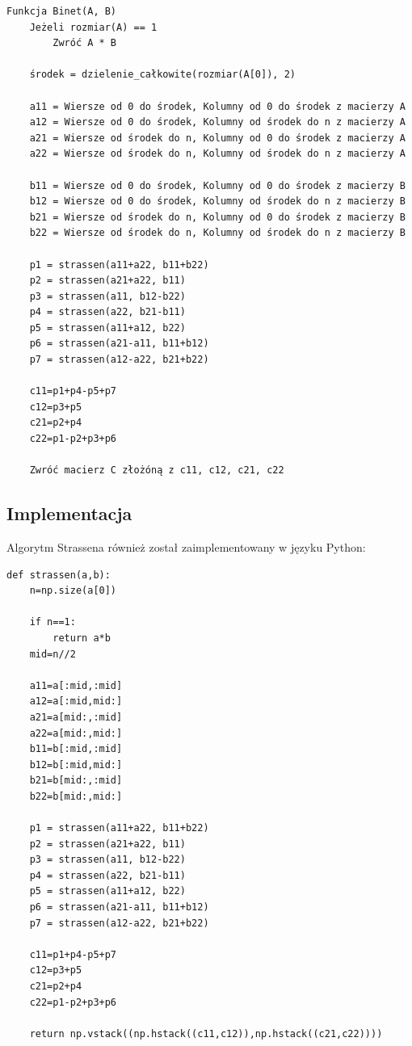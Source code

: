 \documentclass{article}
\begin{document}
\begin{verbatim}
Funkcja Binet(A, B)
    Jeżeli rozmiar(A) == 1
        Zwróć A * B

    środek = dzielenie_całkowite(rozmiar(A[0]), 2) 
    
    a11 = Wiersze od 0 do środek, Kolumny od 0 do środek z macierzy A
    a12 = Wiersze od 0 do środek, Kolumny od środek do n z macierzy A
    a21 = Wiersze od środek do n, Kolumny od 0 do środek z macierzy A
    a22 = Wiersze od środek do n, Kolumny od środek do n z macierzy A
    
    b11 = Wiersze od 0 do środek, Kolumny od 0 do środek z macierzy B
    b12 = Wiersze od 0 do środek, Kolumny od środek do n z macierzy B
    b21 = Wiersze od środek do n, Kolumny od 0 do środek z macierzy B
    b22 = Wiersze od środek do n, Kolumny od środek do n z macierzy B

    p1 = strassen(a11+a22, b11+b22)
    p2 = strassen(a21+a22, b11)
    p3 = strassen(a11, b12-b22)
    p4 = strassen(a22, b21-b11)
    p5 = strassen(a11+a12, b22)
    p6 = strassen(a21-a11, b11+b12)
    p7 = strassen(a12-a22, b21+b22)

    c11=p1+p4-p5+p7
    c12=p3+p5
    c21=p2+p4
    c22=p1-p2+p3+p6

    Zwróć macierz C złożóną z c11, c12, c21, c22
\end{verbatim}

\subsection{Implementacja}

Algorytm Strassena również został zaimplementowany w języku Python:

\begin{verbatim}
def strassen(a,b):
    n=np.size(a[0])
    
    if n==1:
        return a*b
    mid=n//2
    
    a11=a[:mid,:mid]
    a12=a[:mid,mid:]
    a21=a[mid:,:mid]
    a22=a[mid:,mid:]
    b11=b[:mid,:mid]
    b12=b[:mid,mid:]
    b21=b[mid:,:mid]
    b22=b[mid:,mid:]

    p1 = strassen(a11+a22, b11+b22)
    p2 = strassen(a21+a22, b11)
    p3 = strassen(a11, b12-b22)
    p4 = strassen(a22, b21-b11)
    p5 = strassen(a11+a12, b22)
    p6 = strassen(a21-a11, b11+b12)
    p7 = strassen(a12-a22, b21+b22)

    c11=p1+p4-p5+p7
    c12=p3+p5
    c21=p2+p4
    c22=p1-p2+p3+p6

    return np.vstack((np.hstack((c11,c12)),np.hstack((c21,c22))))
\end{verbatim}
\end{document}
